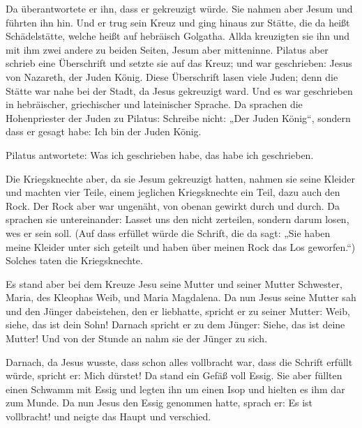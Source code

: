  Da überantwortete er ihn, dass er gekreuzigt würde. Sie
nahmen aber Jesum und führten ihn hin.  Und er trug sein
Kreuz und ging hinaus zur Stätte, die da heißt Schädelstätte, welche
heißt auf hebräisch Golgatha.  Allda kreuzigten sie ihn
und mit ihm zwei andere zu beiden Seiten, Jesum aber mitteninne.
 Pilatus aber schrieb eine Überschrift und setzte sie auf
das Kreuz; und war geschrieben: Jesus von Nazareth, der Juden König.
 Diese Überschrift lasen viele Juden; denn die Stätte war
nahe bei der Stadt, da Jesus gekreuzigt ward. Und es war geschrieben in
hebräischer, griechischer und lateinischer Sprache.  Da
sprachen die Hohenpriester der Juden zu Pilatus: Schreibe nicht: „Der
Juden König``, sondern dass er gesagt habe: Ich bin der Juden König.

 Pilatus antwortete: Was ich geschrieben habe, das habe
ich geschrieben.

 Die Kriegsknechte aber, da sie Jesum gekreuzigt hatten,
nahmen sie seine Kleider und machten vier Teile, einem jeglichen
Kriegsknechte ein Teil, dazu auch den Rock. Der Rock aber war ungenäht,
von obenan gewirkt durch und durch.  Da sprachen sie
untereinander: Lasset uns den nicht zerteilen, sondern darum losen, wes
er sein soll. (Auf dass erfüllet würde die Schrift, die da sagt: „Sie
haben meine Kleider unter sich geteilt und haben über meinen Rock das
Los geworfen.``) Solches taten die Kriegsknechte.

 Es stand aber bei dem Kreuze Jesu seine Mutter und
seiner Mutter Schwester, Maria, des Kleophas Weib, und Maria Magdalena.
 Da nun Jesus seine Mutter sah und den Jünger
dabeistehen, den er liebhatte, spricht er zu seiner Mutter: Weib, siehe,
das ist dein Sohn!  Darnach spricht er zu dem Jünger:
Siehe, das ist deine Mutter! Und von der Stunde an nahm sie der Jünger
zu sich.

 Darnach, da Jesus wusste, dass schon alles vollbracht
war, dass die Schrift erfüllt würde, spricht er: Mich dürstet!
 Da stand ein Gefäß voll Essig. Sie aber füllten einen
Schwamm mit Essig und legten ihn um einen Isop und hielten es ihm dar
zum Munde.  Da nun Jesus den Essig genommen hatte, sprach
er: Es ist vollbracht! und neigte das Haupt und verschied.

